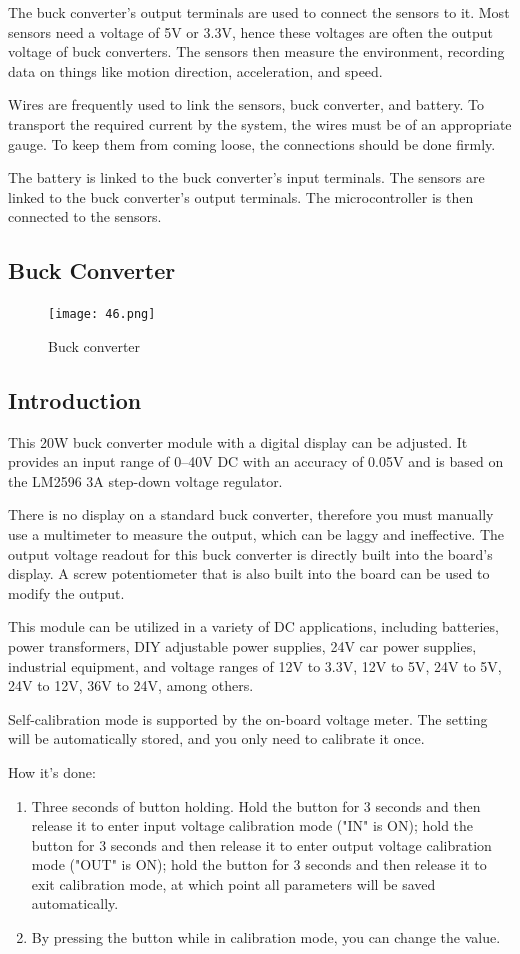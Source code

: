 \documentclass[
12pt,
oneside, 
onehalfspacing, 
nolistspacing, 
parskip, 
chapterinoneline, 
]{AASTCOMPUTER}
\begin{document}
The buck converter's output terminals are used to connect the sensors to it. Most sensors need a voltage of 5V or 3.3V, hence these voltages are often the output voltage of buck converters. The sensors then measure the environment, recording data on things like motion direction, acceleration, and speed.

Wires are frequently used to link the sensors, buck converter, and battery. To transport the required current by the system, the wires must be of an appropriate gauge. To keep them from coming loose, the connections should be done firmly.

The battery is linked to the buck converter's input terminals. The sensors are linked to the buck converter's output terminals. The microcontroller is then connected to the sensors.
\subsection{Buck Converter}
\begin{figure}[!ht]
\centering
\texttt{[image: 46.png]}
\caption[Buck converter]{Buck converter}
\label{fig:TCU}
\end{figure}

\subsection{Introduction}

This 20W buck converter module with a digital display can be adjusted. It provides an input range of 0--40V DC with an accuracy of 0.05V and is based on the LM2596 3A step-down voltage regulator.

There is no display on a standard buck converter, therefore you must manually use a multimeter to measure the output, which can be laggy and ineffective. The output voltage readout for this buck converter is directly built into the board's display. A screw potentiometer that is also built into the board can be used to modify the output.

This module can be utilized in a variety of DC applications, including batteries, power transformers, DIY adjustable power supplies, 24V car power supplies, industrial equipment, and voltage ranges of 12V to 3.3V, 12V to 5V, 24V to 5V, 24V to 12V, 36V to 24V, among others.

Self-calibration mode is supported by the on-board voltage meter. The setting will be automatically stored, and you only need to calibrate it once.

How it's done:
\begin{enumerate}
    \item Three seconds of button holding. Hold the button for 3 seconds and then release it to enter input voltage calibration mode ("IN" is ON); hold the button for 3 seconds and then release it to enter output voltage calibration mode ("OUT" is ON); hold the button for 3 seconds and then release it to exit calibration mode, at which point all parameters will be saved automatically.
    \item By pressing the button while in calibration mode, you can change the value.
\end{enumerate}
\end{document}
